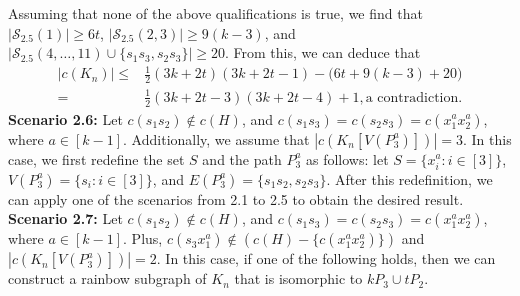 \documentclass[12pt]{article}
\begin{document}
Assuming that none of the above qualifications is true, we find that $|\mathcal{S}_{2.5}(1)| \geq 6t$, $|\mathcal{S}_{2.5}(2,3)| \geq 9(k-3)$, and $|\mathcal{S}_{2.5}(4,\ldots,11) \cup \{s_1s_3,s_2s_3\}| \geq 20$. From this, we can deduce that
 \begin{align*}
  |c(K_n)|\leq & \frac{1}{2}(3k+2t)(3k+2t-1)-\big(6t+9(k-3)+20\big)\\
  = &\frac{1}{2}(3k+2t-3)(3k+2t-4)+1,\text{a contradiction}.
\end{align*}
{\bf Scenario 2.6:} Let \(c(s_1s_2) \notin c(H)\), and \(c(s_1s_3) = c(s_2s_3) = c(x^a_1x^a_2)\), where \(a \in [k-1]\). Additionally, we assume that \(|c(K_n[V(P^a_3)])| = 3\). 
In this case, we first redefine the set \(S\) and the path \(P_3^a\) as follows: let \(S = \{x^a_i : i \in [3]\}\), \(V(P^a_3) = \{s_i : i \in [3]\}\), and \(E(P_3^a) = \{s_1s_2, s_2s_3\}\). After this redefinition, we can apply one of the scenarios from 2.1 to 2.5 to obtain the desired result.\\
{\bf Scenario 2.7:} Let \(c(s_1s_2) \notin c(H)\), and \(c(s_1s_3) = c(s_2s_3) = c(x^a_1x^a_2)\), where \(a \in [k-1]\). Plus, $c(s_3x^a_1)\not\in (c(H)-\{c(x^a_1x^a_2)\})$ and \(|c(K_n[V(P^a_3)])| =2\).
 In this case, if one of the following holds, then we can construct a rainbow subgraph of \(K_n\) that is isomorphic to \(kP_3 \cup tP_2\). 
\end{document}
